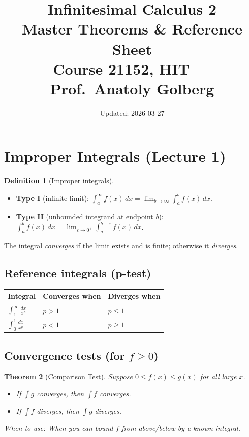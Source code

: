\documentclass[12pt,a4paper]{article}
\title{\textbf{Infinitesimal Calculus 2}\\
\large Master Theorems \& Reference Sheet\\[4pt]
\normalsize Course 21152, HIT --- Prof.\ Anatoly Golberg}
\date{Updated: 2026-03-27}
\newtheorem{theorem}{Theorem}[section]
\theoremstyle{definition}
\newtheorem{definition}[theorem]{Definition}
\theoremstyle{remark}
\begin{document}
\maketitle
\tableofcontents
\newpage

\section{Improper Integrals (Lecture 1)}

\begin{definition}[Improper integrals]
\begin{itemize}
  \item \textbf{Type I} (infinite limit):
    $\displaystyle\int_a^{\infty} f(x)\,dx = \lim_{b\to\infty}\int_a^b f(x)\,dx$.
  \item \textbf{Type II} (unbounded integrand at endpoint $b$):
    $\displaystyle\int_a^b f(x)\,dx = \lim_{\varepsilon\to 0^+}\int_a^{b-\varepsilon} f(x)\,dx$.
\end{itemize}
The integral \emph{converges} if the limit exists and is finite; otherwise it \emph{diverges}.
\end{definition}

\subsection*{Reference integrals (p-test)}

\begin{center}
\begin{tabular}{lll}
\toprule
Integral & Converges when & Diverges when \\
\midrule
$\displaystyle\int_1^{\infty}\frac{dx}{x^p}$ & $p>1$ & $p\le 1$ \\[10pt]
$\displaystyle\int_0^{1}\frac{dx}{x^p}$ & $p<1$ & $p\ge 1$ \\
\bottomrule
\end{tabular}
\end{center}

\subsection*{Convergence tests (for $f\ge 0$)}

\begin{theorem}[Comparison Test]
Suppose $0\le f(x)\le g(x)$ for all large $x$.
\begin{itemize}
  \item If $\int g$ converges, then $\int f$ converges.
  \item If $\int f$ diverges, then $\int g$ diverges.
\end{itemize}
\textit{When to use:} When you can bound $f$ from above/below by a known integral.
\end{theorem}
\end{document}
